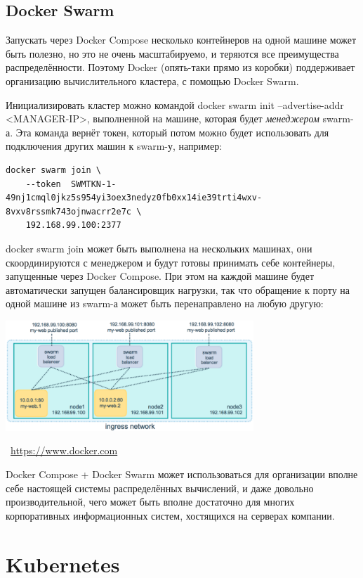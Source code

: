\documentclass[a5paper]{article}
\newcommand{\attribution}[1] {
    \vspace{-5mm}\begin{flushright}\begin{scriptsize}\textcolor{gray}{\textcopyright\, #1}\end{scriptsize}\end{flushright}
}
\begin{document}
\subsection{Docker Swarm}

Запускать через Docker Compose несколько контейнеров на одной машине может быть полезно, но это не очень масштабируемо, и теряются все преимущества распределённости. Поэтому Docker (опять-таки прямо из коробки) поддерживает организацию вычислительного кластера, с помощью Docker Swarm.

Инициализировать кластер можно командой docker swarm init --advertise-addr <MANAGER-IP>, выполненной на машине, которая будет \emph{менеджером} swarm-а. Эта команда вернёт токен, который потом можно будет использовать для подключения других машин к swarm-у, например: 

\begin{verbatim}
docker swarm join \
    --token  SWMTKN-1-49nj1cmql0jkz5s954yi3oex3nedyz0fb0xx14ie39trti4wxv-8vxv8rssmk743ojnwacrr2e7c \
    192.168.99.100:2377
\end{verbatim}

docker swarm join может быть выполнена на нескольких машинах, они скоординируются с менеджером и будут готовы принимать себе контейнеры, запущенные через Docker Compose. При этом на каждой машине будет автоматически запущен балансировщик нагрузки, так что обращение к порту на одной машине из swarm-а может быть перенаправлено на любую другую:

\begin{center}
    \includegraphics[width=0.7\textwidth]{swarmLoadBalancing.png}
    \attribution{\url{https://www.docker.com}}
\end{center}

Docker Compose + Docker Swarm может использоваться для организации вполне себе настоящей системы распределённых вычислений, и даже довольно производительной, чего может быть вполне достаточно для многих корпоративных информационных систем, хостящихся на серверах компании.

\section{Kubernetes}
\end{document}

